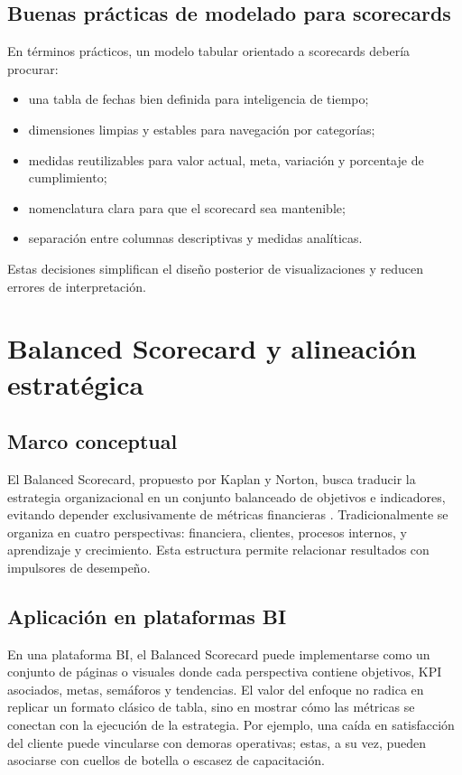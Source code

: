 \documentclass[12pt]{article}
\begin{document}
\subsection{Buenas prácticas de modelado para scorecards}
En términos prácticos, un modelo tabular orientado a scorecards debería procurar:
\begin{itemize}[leftmargin=*]
\item una tabla de fechas bien definida para inteligencia de tiempo;
\item dimensiones limpias y estables para navegación por categorías;
\item medidas reutilizables para valor actual, meta, variación y porcentaje de cumplimiento;
\item nomenclatura clara para que el scorecard sea mantenible;
\item separación entre columnas descriptivas y medidas analíticas.
\end{itemize}

Estas decisiones simplifican el diseño posterior de visualizaciones y reducen errores de interpretación.

\section{Balanced Scorecard y alineación estratégica}
\subsection{Marco conceptual}
El Balanced Scorecard, propuesto por Kaplan y Norton, busca traducir la estrategia organizacional en un conjunto balanceado de objetivos e indicadores, evitando depender exclusivamente de métricas financieras \cite{kaplan1992measures,kaplan1996bsc}. Tradicionalmente se organiza en cuatro perspectivas: financiera, clientes, procesos internos, y aprendizaje y crecimiento. Esta estructura permite relacionar resultados con impulsores de desempeño.

\subsection{Aplicación en plataformas BI}
En una plataforma BI, el Balanced Scorecard puede implementarse como un conjunto de páginas o visuales donde cada perspectiva contiene objetivos, KPI asociados, metas, semáforos y tendencias. El valor del enfoque no radica en replicar un formato clásico de tabla, sino en mostrar cómo las métricas se conectan con la ejecución de la estrategia. Por ejemplo, una caída en satisfacción del cliente puede vincularse con demoras operativas; estas, a su vez, pueden asociarse con cuellos de botella o escasez de capacitación.
\end{document}
